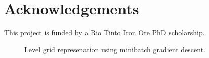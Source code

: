 \documentclass[manuscript.tex]{subfiles}
\begin{document}
\section{Acknowledgements}
This project is funded by a Rio Tinto Iron Ore PhD scholarship.

\printbibliography{}



\begin{figure}[hbt]
    \caption[Menzies INR]{Level grid represenation using minibatch gradient descent.}
    \label{fig:vert_grad}
\end{figure}
\end{document}
